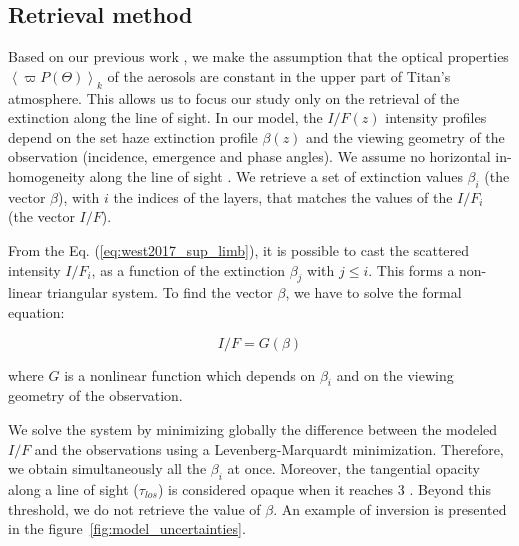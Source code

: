 \subsection{Retrieval method}

Based on our previous work \citep{Seignovert2017, West2018}, we make the assumption that the optical properties $\left<\varpi P(\Theta)\right>_k$ of the aerosols are constant in the upper part of Titan's atmosphere. This allows us to focus our study only on the retrieval of the extinction along the line of sight.
In our model, the $I/F (z)$ intensity profiles depend on the set haze extinction profile $\beta(z)$ and the viewing geometry of the observation (incidence, emergence and phase angles).
We assume no horizontal in-homogeneity along the line of sight \citep{Seignovert2017}. We retrieve a set of extinction values $\beta_i$ (the vector ${\beta}$), with $i$ the indices of the layers, that matches the values of the $I/F_i$ (the vector $I/F$).

From the Eq. (\ref{eq:west2017_sup_limb}), it is possible to cast the scattered intensity $I/F_i$, as a function of the extinction $\beta_j$ with $j \le i$. This forms a non-linear triangular system. To find the vector $\beta$, we have to solve the formal equation:

\begin{equation}
    I/F = G(\beta)
\end{equation}

where ${G}$ is a nonlinear function which depends on $\beta_i$ and on the viewing geometry of the observation.

We solve the system by minimizing globally the difference between the modeled $I/F$ and the observations
using a Levenberg-Marquardt minimization. Therefore, we obtain simultaneously all the $\beta_i$ at once.
Moreover, the tangential opacity along a line of sight ($\tau_{los}$) is considered opaque when it reaches 3 .
Beyond this threshold, we do not retrieve the value of $\beta$.
An example of inversion is presented in the figure~\ref{fig:model_uncertainties}.

